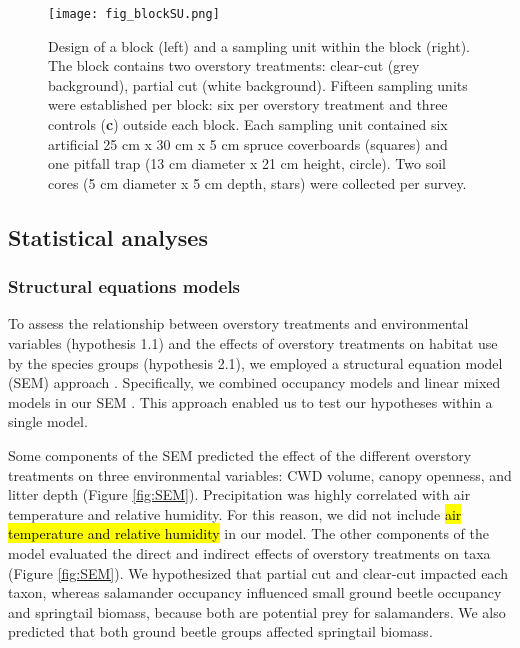 \pagebreak

\begin{figure}[ht]
	\centering
	\texttt{[image: fig\_blockSU.png]}
	\caption[Design of one block and one sampling unit with three sampling methods.]{
  Design of a block (left) and a sampling unit within the block (right). 
  The block contains two overstory treatments: clear-cut (grey background), partial cut (white background). 
  Fifteen sampling units were established per block: six per overstory treatment and three controls (\textbf{c}) outside each block.
  Each sampling unit contained six artificial 25 cm x 30 cm x 5 cm spruce coverboards (squares) and one pitfall trap (13 cm diameter x 21 cm height, circle). 
  Two soil cores (5 cm diameter x 5 cm depth, stars) were collected per survey.
  }
	\label{fig:blockSU}
	\end{figure}  


\subsection*{Statistical analyses}
\label{subsec:analyses}

\subsubsection{Structural equations models} 

To assess the relationship between overstory treatments and environmental variables (hypothesis 1.1) and the effects of overstory treatments on habitat use by the species groups (hypothesis 2.1), 
we employed a structural equation model (SEM) approach \citep{graceSpecificationStructuralEquation2010}. 
Specifically, we combined occupancy models and linear mixed models in our SEM \citep{mackenzieOccupancyEstimationModeling2006a,graceSpecificationStructuralEquation2010,josephIntegratingOccupancyModels2016}.
This approach enabled us to test our hypotheses within a single model. 

Some components of the SEM predicted the effect of the different overstory treatments on three environmental variables: CWD volume, canopy openness, and litter depth (Figure \ref{fig:SEM}). 
Precipitation was highly correlated with air temperature and relative humidity. 
For this reason, we did not include \hl{air temperature and relative humidity} in our model. 
The other components of the model evaluated the direct and indirect effects of overstory treatments on taxa (Figure \ref{fig:SEM}). 
We hypothesized that partial cut and clear-cut impacted each taxon, whereas salamander occupancy influenced small ground beetle occupancy and springtail biomass, because both are potential prey for salamanders. 
We also predicted that both ground beetle groups affected springtail biomass.

